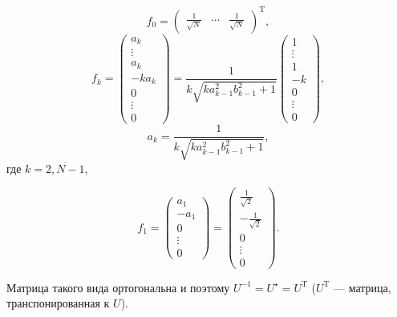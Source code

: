 \begin{lemma}
\begin{minipage}{0.9\textwidth}
            \[f_0 = \begin{pmatrix} \frac{1}{\sqrt N} & \cdots & \frac{1}{\sqrt N} \end{pmatrix}^{\mathrm{T}}, \]
                \providecommand{\fknorm}{\sqrt{k a_{k-1}^2 b_{k-1}^2 + 1}}
            \[
                f_k =
            \begin{pmatrix}a_k \\ \vdots \\ a_k \\ -ka_k \\ 0 \\ \vdots \\ 0 \end{pmatrix} =
                \frac{1}{k\fknorm}
            \begin{pmatrix}1 \\ \vdots \\ 1 \\ -k \\ 0 \\ \vdots \\ 0 \end{pmatrix},
                \]
            \[
                a_k = \frac{1}{k\fknorm},
            \]
        где \( k=\overline{2,N-1}, \)

            \[
                f_1
             = \begin{pmatrix}a_1 \\ -a_1 \\ 0 \\ \vdots \\ 0 \end{pmatrix}
                 = \begin{pmatrix}\frac1{\sqrt2} \\ - \frac{1}{\sqrt2} \\ 0 \\ \vdots \\ 0 \end{pmatrix}.
                     \]

                 Матрица такого вида ортогональна и поэтому
            \( U^{-1} = U^\star = U^{\mathrm{T}} \) (\( U^\mathrm{T} \) --- матрица, транспонированная к \( U \)).
        \end{minipage}
\end{lemma}
